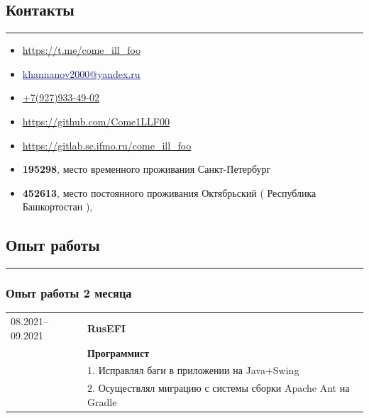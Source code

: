 \documentclass[10pt, final, twoside]{article}
\begin{document}
  \subsection*{\textcolor{darkgray2}{Контакты}}
  \vspace*{-5.5mm}
  \par\noindent\rule{\textwidth}{0.1pt}
  \begin{itemize}
    \item[\textcolor{MidnightBlue}{\textbullet}] \textcolor{MidnightBlue}{\underline{\url{https://t.me/come_ill_foo}}}
    \item[\textcolor{MidnightBlue}{\textbullet}] \href{mailto:khannanov2000@yandex.ru}{\textcolor{MidnightBlue}{\underline{khannanov2000@yandex.ru}}}
    \item[\textcolor{MidnightBlue}{\textbullet}] \href{tel:79279334902}{+7(927)933-49-02}
    \item[\textcolor{MidnightBlue}{\textbullet}] \textcolor{MidnightBlue}{\underline{\url{https://github.com/Come1LLF00}}}
    \item[\textcolor{MidnightBlue}{\textbullet}] \textcolor{MidnightBlue}{\underline{\url{https://gitlab.se.ifmo.ru/come_ill_foo}}}
  \end{itemize}

  \begin{itemize}
    \item \textbf{195298}, место временного проживания Санкт-Петербург
    \item \textbf{452613}, место постоянного проживания Октябрьский ( Республика Башкортостан ),
  \end{itemize}

  
  \subsection*{\textcolor{darkgray2}{Опыт работы}}
  \vspace*{-5.5mm}
  \par\noindent\rule{\textwidth}{0.1pt}
  \subsubsection*{Опыт работы 2 месяца}
  \begin{table}[H]
    \begin{tabular}{ll}
      08.2021--09.2021 & \textbf{RusEFI}\\
                       & \textbf{Программист}\\
                       & 1. Исправлял баги в приложении на Java+Swing\\
                       & 2. Осуществлял миграцию с системы сборки Apache Ant на Gradle 
    \end{tabular}
  \end{table}
\end{document}
